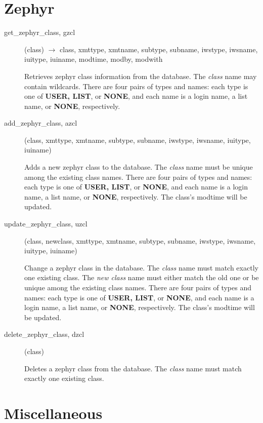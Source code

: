 \section{Zephyr}

\begin{description}

\item[get\_zephyr\_class, gzcl](class) $\rightarrow$ class, xmttype, xmtname,
subtype, subname, iwstype, iwsname, iuitype, iuiname, modtime, modby,
modwith

Retrieves zephyr class information from the database.  The {\em class}
name may contain wildcards.  There are four pairs of types and names:
each type is one of {\bf USER, LIST}, or {\bf NONE}, and each name is a
login name, a list name, or {\bf NONE}, respectively.

\item[add\_zephyr\_class, azcl](class, xmttype, xmtname, subtype, subname,
iwstype, iwsname, iuitype, iuiname)

Adds a new zephyr class to the database.  The {\em class} name must be
unique among the existing class names.  There are four pairs of types
and names: each type is one of {\bf USER, LIST}, or {\bf NONE}, and each
name is a login name, a list name, or {\bf NONE}, respectively.  The
class's modtime will be updated.

\item[update\_zephyr\_class, uzcl](class, newclass, xmttype, xmtname, subtype,
subname, iwstype, iwsname, iuitype, iuiname)

Change a zephyr class in the database.  The {\em class} name must match
exactly one existing class.  The {\em new class} name must either match
the old one or be unique among the existing class names.  There are
four pairs of types and names: each type is one of {\bf USER, LIST}, or
{\bf NONE}, and each name is a login name, a list name, or {\bf NONE},
respectively.  The class's modtime will be updated.

\item[delete\_zephyr\_class, dzcl](class)

Deletes a zephyr class from the database.  The {\em class} name must
match exactly one existing class.

\end{description}

\section{Miscellaneous}

